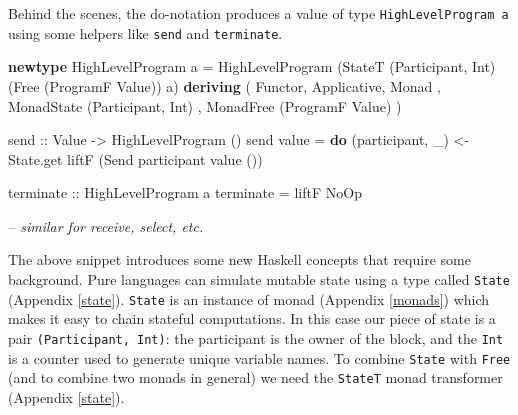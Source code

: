 \documentclass[runningheads,plain]{llncs}
\newenvironment{Shaded}{}{}
\newcommand{\KeywordTok}[1]{\textcolor[rgb]{0.00,0.44,0.13}{\textbf{#1}}}
\newcommand{\DataTypeTok}[1]{\textcolor[rgb]{0.56,0.13,0.00}{#1}}
\newcommand{\DecValTok}[1]{\textcolor[rgb]{0.25,0.63,0.44}{#1}}
\newcommand{\StringTok}[1]{\textcolor[rgb]{0.25,0.44,0.63}{#1}}
\newcommand{\CommentTok}[1]{\textcolor[rgb]{0.38,0.63,0.69}{\textit{#1}}}
\newcommand{\OtherTok}[1]{\textcolor[rgb]{0.00,0.44,0.13}{#1}}
\newcommand{\FunctionTok}[1]{\textcolor[rgb]{0.02,0.16,0.49}{#1}}
\newcommand{\NormalTok}[1]{#1}
\begin{document}
\begin{Shaded}
\end{Shaded}

Behind the scenes, the do-notation produces a value of type
\texttt{HighLevelProgram\ a} using some helpers like \texttt{send} and
\texttt{terminate}.

\begin{Shaded}
\begin{Highlighting}[]
\KeywordTok{newtype} \DataTypeTok{HighLevelProgram}\NormalTok{ a }\FunctionTok{=} \DataTypeTok{HighLevelProgram} 
\NormalTok{    (}\DataTypeTok{StateT}\NormalTok{ (}\DataTypeTok{Participant}\NormalTok{, }\DataTypeTok{Int}\NormalTok{) (}\DataTypeTok{Free}\NormalTok{ (}\DataTypeTok{ProgramF} \DataTypeTok{Value}\NormalTok{)) a)}
    \KeywordTok{deriving} 
\NormalTok{        ( }\DataTypeTok{Functor}\NormalTok{, }\DataTypeTok{Applicative}\NormalTok{, }\DataTypeTok{Monad}
\NormalTok{        , }\DataTypeTok{MonadState}\NormalTok{ (}\DataTypeTok{Participant}\NormalTok{, }\DataTypeTok{Int}\NormalTok{)}
\NormalTok{        , }\DataTypeTok{MonadFree}\NormalTok{ (}\DataTypeTok{ProgramF} \DataTypeTok{Value}\NormalTok{)}
\NormalTok{        )}

\OtherTok{send ::} \DataTypeTok{Value} \OtherTok{->} \DataTypeTok{HighLevelProgram}\NormalTok{ ()}
\NormalTok{send value }\FunctionTok{=} \KeywordTok{do}
\NormalTok{    (participant, _) }\OtherTok{<-}\NormalTok{ State.get}
\NormalTok{    liftF (}\DataTypeTok{Send}\NormalTok{ participant value ())  }

\OtherTok{terminate ::} \DataTypeTok{HighLevelProgram}\NormalTok{ a}
\NormalTok{terminate }\FunctionTok{=}\NormalTok{ liftF }\DataTypeTok{NoOp}

\CommentTok{-- similar for receive, select, etc.}
\end{Highlighting}
\end{Shaded}

The above snippet introduces some new Haskell concepts that require some
background. Pure languages can simulate mutable state using a type
called \texttt{State} (Appendix \ref{state}). \texttt{State} is an
instance of monad (Appendix \ref{monads}) which makes it easy to chain
stateful computations. In this case our piece of state is a pair
\texttt{(Participant,\ Int)}: the participant is the owner of the block,
and the \texttt{Int} is a counter used to generate unique variable
names. To combine \texttt{State} with \texttt{Free} (and to combine two
monads in general) we need the \texttt{StateT} monad transformer
(Appendix \ref{state}).
\end{document}
